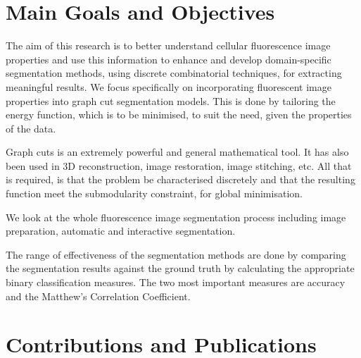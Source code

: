 \section{Main Goals and Objectives}

The aim of this research is to better understand cellular fluorescence image properties and use this information to enhance and develop domain-specific segmentation methods, using discrete combinatorial techniques, for extracting meaningful results. 
We focus specifically on incorporating fluorescent image properties into graph cut segmentation models. 
This is done by tailoring the energy function, which is to be minimised, to suit the need, given the properties of the data.

Graph cuts is an extremely powerful and general mathematical tool. 
It has also been used in 3D reconstruction, image restoration, image stitching, etc. 
All that is required, is that the problem be characterised discretely and that the resulting function meet the submodularity constraint, for global minimisation.

We look at the whole fluorescence image segmentation process including image preparation, automatic and interactive segmentation.

The range of effectiveness of the segmentation methods are done by comparing the segmentation results against the ground truth by calculating the appropriate binary classification measures. The two most important measures are accuracy and the Matthew's Correlation Coefficient.



\section{Contributions and Publications}
\textcolor{red}
{
}

